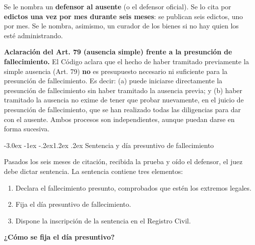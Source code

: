 \documentclass[12pt,oneside]{book}
\makeatletter
\renewcommand\section{\@startsection{section}{1}{\z@}%
  {-3.0ex \@plus -1ex \@minus -.2ex}{1.2ex \@plus .2ex}%
  {\normalfont\large\bfseries\color{acento}}}
\makeatother
\begin{document}
Se le nombra un \textbf{defensor al ausente} (o el defensor oficial). Se
lo cita por \textbf{edictos una vez por mes durante seis meses}: se
publican seis edictos, uno por mes. Se le nombra, asimismo, un curador de
los bienes si no hay quien los esté administrando.

\begin{importante}
\textbf{Aclaración del Art. 79 (ausencia simple) frente a la presunción
de fallecimiento.} El Código aclara que el hecho de haber tramitado
previamente la simple ausencia (Art. 79) \textbf{no} es presupuesto
necesario ni suficiente para la presunción de fallecimiento. Es decir:
(a) puede iniciarse directamente la presunción de fallecimiento sin haber
tramitado la ausencia previa; y (b) haber tramitado la ausencia no exime
de tener que probar nuevamente, en el juicio de presunción de
fallecimiento, que se han realizado todas las diligencias para dar con el
ausente. Ambos procesos son independientes, aunque puedan darse en forma
sucesiva.
\end{importante}

\section{Sentencia y día presuntivo de fallecimiento}

Pasados los seis meses de citación, recibida la prueba y oído el
defensor, el juez debe dictar sentencia. La sentencia contiene tres
elementos:

\begin{enumerate}
    \item Declara el fallecimiento presunto, comprobados que estén los extremos legales.
    \item Fija el día presuntivo de fallecimiento.
    \item Dispone la inscripción de la sentencia en el Registro Civil.
\end{enumerate}

\textbf{¿Cómo se fija el día presuntivo?}
\end{document}
